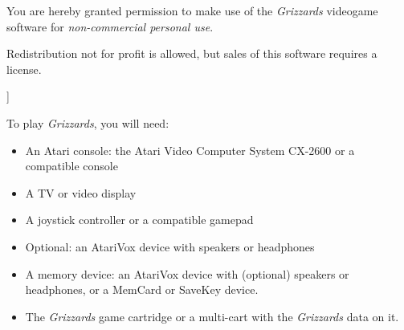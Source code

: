 \documentclass[10pt,twocolumn,openany,article]{memoir}
\newenvironment{ritemize}{\begin{itemize}\raggedright}{\end{itemize}}
\begin{document}
\bigskip

You are hereby granted permission  to make use of the \textit{Grizzards}
videogame software for \emph{non-commercial personal use}.

Redistribution not for profit is allowed, but sales of this software
requires a license.

\fi

]

\let\cleardoublepage\clearpage

\mainmatter

\tableofcontents


To play \textit{Grizzards}, you will need:

\vspace{12pt}

\begin{ritemize}
\item  An Atari  console: the  Atari  Video Computer  System CX-2600  or
  a compatible console
\item A TV or video display
\item A joystick controller or a compatible gamepad
  \ifdefined\ATARIAGESAVE
  \item Optional: an AtariVox device with speakers or headphones
  \else
  \ifdefined\NOSAVE\else
\item A  memory device: an  AtariVox device with (optional)  speakers or
  headphones, or a MemCard or SaveKey device.
  \fi\fi
\item The \textit{Grizzards} game cartridge \ifdefined\ATARIAGESAVE\else
  or a multi-cart with the \textit{Grizzards} data on it. \fi
\end{ritemize}
\end{document}

